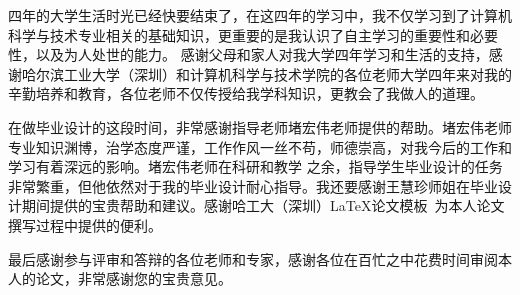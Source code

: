 
\begin{acknowledgements}
四年的大学生活时光已经快要结束了，在这四年的学习中，我不仅学习到了计算机科学与技术专业相关的基础知识，更重要的是我认识了自主学习的重要性和必要性，以及为人处世的能力。
感谢父母和家人对我大学四年学习和生活的支持，感谢哈尔滨工业大学（深圳）和计算机科学与技术学院的各位老师大学四年来对我的辛勤培养和教育，各位老师不仅传授给我学科知识，更教会了我做人的道理。


在做毕业设计的这段时间，非常感谢指导老师堵宏伟老师提供的帮助。堵宏伟老师专业知识渊博，治学态度严谨，工作作风一丝不苟，师德崇高，对我今后的工作和学习有着深远的影响。堵宏伟老师在科研和教学
之余，指导学生毕业设计的任务非常繁重，但他依然对于我的毕业设计耐心指导。我还要感谢王慧珍师姐在毕业设计期间提供的宝贵帮助和建议。感谢哈工大（深圳）\LaTeX{}论文模板\hitszthesis\ 
为本人论文撰写过程中提供的便利。


最后感谢参与评审和答辩的各位老师和专家，感谢各位在百忙之中花费时间审阅本人的论文，非常感谢您的宝贵意见。
\end{acknowledgements}

